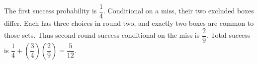The first success probability is $\dfrac{1}{4}$. Conditional on a miss, their two excluded boxes differ. Each has three choices in round two, and exactly two boxes are common to those sets. Thus second-round success conditional on the miss is $\dfrac{2}{9}$. Total success is $\dfrac{1}{4}+(\dfrac{3}{4})(\dfrac{2}{9})=\boxed{\dfrac{5}{12}}$.
